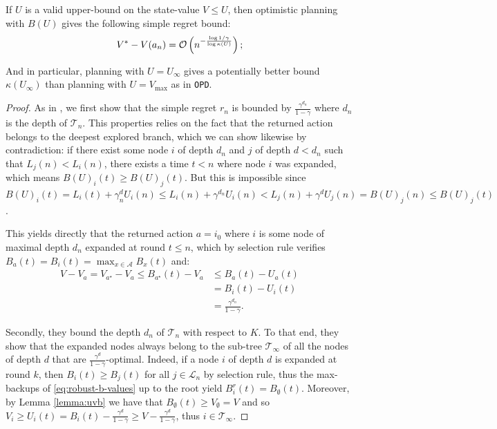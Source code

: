 \documentclass{article}
\begin{document}
\begin{theorem}
If $U$ is a valid upper-bound on the state-value $V\leq U$, then optimistic planning with $B(U)$ gives the following simple regret bound: %
\begin{align*}
V^* - V({a_n}) = \mathcal{O}\left(n^{-\frac{\log 1/\gamma}{\log \kappa(U)}}\right);
\end{align*}
\end{theorem}

And in particular, planning with $U=U_\infty$ gives a potentially better bound $\kappa(U_\infty)$ than planning with $U=V_{\max}$ as in \texttt{OPD}.

\begin{proof}
	As in \citep[][Theorem 2]{Hren2008}, we first show that the simple regret $r_n$ is bounded by $\frac{\gamma^{d_n}}{1 - \gamma}$ where $d_n$ is the depth of $\mathcal{T}_n$. This properties relies on the fact that the returned action belongs to the deepest explored branch, which we can show likewise by contradiction: if there exist some node $i$ of depth $d_n$ and $j$ of depth $d<d_n$ such that $L_j(n) < L_i(n)$, there exists a time $t<n$ where node $i$ was expanded, which means $B(U)_i(t) \geq B(U)_j(t)$. But this is impossible since $B(U)_i(t) = L_i(t) + \gamma^d_n U_i(n) \leq L_i(n) + \gamma^{d_n} U_i(n) < L_j(n) + \gamma^d U_j(n) = B(U)_j(n) \leq B(U)_j(t)$.
	
	This yields directly that the returned action $a = i_0$ where $i$ is some node of maximal depth $d_n$ expanded at round $t\leq n$, which by selection rule verifies $B_a(t) = B_i(t) = \max_{x\in\mathcal{A}} B_x(t)$ and:
	\begin{align*}
	\label{eq:Rndn}
	V - V_a = V_{a^{\star}} - V_a  \leq B_{a^{\star}}(t) - V_a &\leq B_{a}(t) - U_a(t) \\
	&= B_{i}(t) - U_i(t) \\
	&= \frac{\gamma^{d_n}}{1-\gamma}.
	\end{align*}
	
	Secondly, they bound the depth $d_n$ of $\mathcal{T}_n$ with respect to $K$. To that end, they show that the expanded nodes always belong to the sub-tree $\mathcal{T}_\infty$ of all the nodes of depth $d$ that are $\frac{\gamma^d}{1-\gamma}$-optimal. Indeed, if a node $i$ of depth $d$ is expanded at round $k$, then $B_i(t) \geq B_j(t)$ for all $j\in \mathcal{L}_n$ by selection rule, thus the max-backups of \eqref{eq:robust-b-values} up to the root yield $B^r_i(t) = B_\emptyset(t)$. Moreover, by Lemma \ref{lemma:uvb} we have that $B_\emptyset(t) \geq V_\emptyset = V$ and so $V_i \geq U_i(t) = B_i(t) - \frac{\gamma^d}{1-\gamma} \geq V - \frac{\gamma^d}{1-\gamma}$, thus $i \in \mathcal{T}_\infty$.
	

\end{proof}
\end{document}
